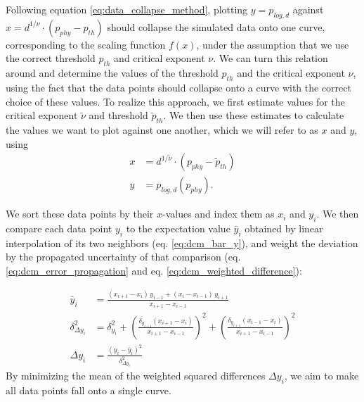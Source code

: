 Following equation \eqref{eq:data_collapse_method}, plotting $y=p_{log,d}$ against $x=d^{1/\nu} \cdot(p_{phy}-p_{th})$ should collapse the simulated data onto one curve, 
corresponding to the scaling function $f(x)$, 
under the assumption that we use the correct threshold $p_{th}$ and critical exponent $\nu$.
We can turn this relation around and determine the values of the threshold $p_{th}$ and the critical exponent $\nu$, 
using the fact that the data points should collapse onto a curve with the correct choice of these values.
To realize this approach, we first estimate values for the critical exponent $\tilde{\nu}$ and threshold $\tilde{p}_{th}$.
We then use these estimates to calculate the values we want to plot against one another, which we will refer to as $x$ and $y$, using 
\begin{align}
    x&=d^{1/\tilde{\nu}} \cdot(p_{phy}-\tilde{p}_{th}) 
    \label{eq:data_collapse_x}
    \\
    y&=p_{log,d}(p_{phy}).
\end{align}

We sort these data points by their $x$-values and index them as $x_i$ and $y_i$. 
We then compare each data point $y_i$ to the expectation value $\bar{y}_i$ obtained by linear interpolation of its two neighbors (eq. \ref{eq:dcm_bar_y}), 
and weight the deviation by the propagated uncertainty of that comparison (eq. \ref{eq:dcm_error_propagation} and eq. \ref{eq:dcm_weighted_difference}):

\begin{align}
\bar{y}_i &= \frac{(x_{i+1} - x_i)\,y_{i-1} + (x_{i} - x_{i-1})\,y_{i+1}}{x_{i+1} - x_{i-1}} \label{eq:dcm_bar_y}\\
\delta_{\Delta y_i}^2 &= \delta_{y_i}^2 + \left(\frac{\delta_{y_{i-1}} (x_{i+1} - x_i)}{x_{i+1} - x_{i-1}}\right)^2 + \left(\frac{\delta_{y_{i+1}}(x_{i-1} - x_i)}{x_{i+1} - x_{i-1}}\right)^2 \label{eq:dcm_error_propagation} \\
\Delta y_i&= \frac{(y_i - \bar{y}_i)^2}{\delta_{\Delta y_{i}}^2} \label{eq:dcm_weighted_difference}
\end{align}
By minimizing the mean of the weighted squared differences $\Delta y_i$, we aim to make all data points fall onto a single curve.


